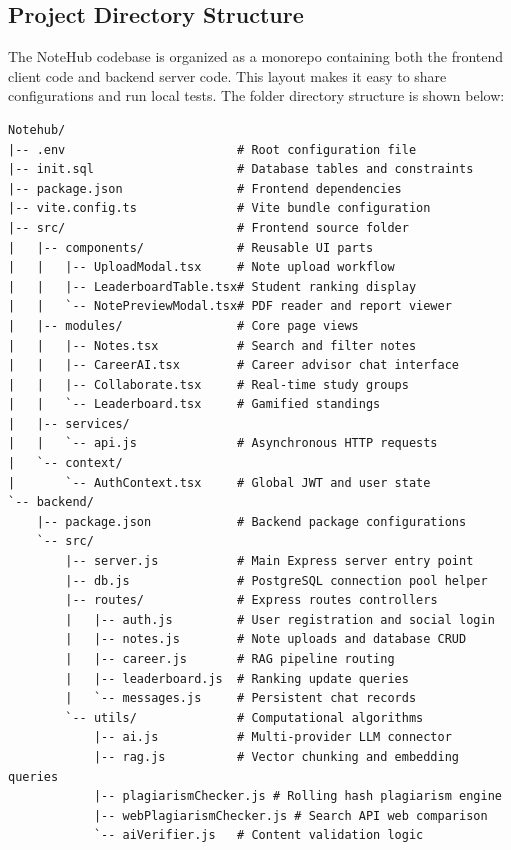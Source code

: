 \documentclass[12,Times new Roman,a4paper]{report}
\begin{document}
\subsection{Project Directory Structure}

The NoteHub codebase is organized as a monorepo containing both the frontend client code and backend server code. This layout makes it easy to share configurations and run local tests. The folder directory structure is shown below:

\begin{verbatim}
Notehub/
|-- .env                        # Root configuration file
|-- init.sql                    # Database tables and constraints
|-- package.json                # Frontend dependencies
|-- vite.config.ts              # Vite bundle configuration
|-- src/                        # Frontend source folder
|   |-- components/             # Reusable UI parts
|   |   |-- UploadModal.tsx     # Note upload workflow
|   |   |-- LeaderboardTable.tsx# Student ranking display
|   |   `-- NotePreviewModal.tsx# PDF reader and report viewer
|   |-- modules/                # Core page views
|   |   |-- Notes.tsx           # Search and filter notes
|   |   |-- CareerAI.tsx        # Career advisor chat interface
|   |   |-- Collaborate.tsx     # Real-time study groups
|   |   `-- Leaderboard.tsx     # Gamified standings
|   |-- services/
|   |   `-- api.js              # Asynchronous HTTP requests
|   `-- context/
|       `-- AuthContext.tsx     # Global JWT and user state
`-- backend/
    |-- package.json            # Backend package configurations
    `-- src/
        |-- server.js           # Main Express server entry point
        |-- db.js               # PostgreSQL connection pool helper
        |-- routes/             # Express routes controllers
        |   |-- auth.js         # User registration and social login
        |   |-- notes.js        # Note uploads and database CRUD
        |   |-- career.js       # RAG pipeline routing
        |   |-- leaderboard.js  # Ranking update queries
        |   `-- messages.js     # Persistent chat records
        `-- utils/              # Computational algorithms
            |-- ai.js           # Multi-provider LLM connector
            |-- rag.js          # Vector chunking and embedding queries
            |-- plagiarismChecker.js # Rolling hash plagiarism engine
            |-- webPlagiarismChecker.js # Search API web comparison
            `-- aiVerifier.js   # Content validation logic
\end{verbatim}
\end{document}
